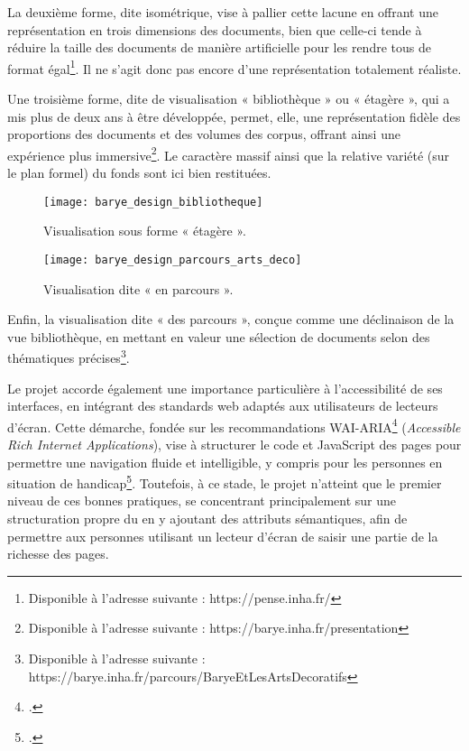 La deuxième forme, dite isométrique, vise à pallier cette lacune en offrant une représentation en trois dimensions des documents, bien que celle-ci tende à réduire la taille des documents de manière artificielle pour les rendre tous de format égal\footnote{Disponible à l’adresse suivante : https://pense.inha.fr/}. Il ne s’agit donc pas encore d’une représentation totalement réaliste.

Une troisième forme, dite de visualisation « bibliothèque » ou « étagère », qui a mis plus de deux ans à être développée, permet, elle, une représentation fidèle des proportions des documents et des volumes des corpus, offrant ainsi une expérience plus immersive\footnote{Disponible à l’adresse suivante : https://barye.inha.fr/presentation}. Le caractère massif ainsi que la relative variété (sur le plan formel) du fonds sont ici bien restituées.

\begin{figure}[h] 
        \centering 
        \texttt{[image: barye\_design\_bibliotheque]} 
        \caption{ Visualisation sous forme « étagère ».} 
        \label{fig:visualisation-biblio} 
\end{figure}

\begin{figure}[h] 
        \centering 
        \texttt{[image: barye\_design\_parcours\_arts\_deco]} 
        \caption{Visualisation dite « en parcours ».} 
        \label{fig:visualisation-parcours} 
    \end{figure}

Enfin, la visualisation dite « des parcours », conçue comme une déclinaison de la vue bibliothèque, en mettant en valeur une sélection de documents selon des thématiques précises\footnote{Disponible à l’adresse suivante : https://barye.inha.fr/parcours/BaryeEtLesArtsDecoratifs}.


Le projet \pense accorde également une importance particulière à l’accessibilité de ses interfaces, en intégrant des standards web adaptés aux utilisateurs de lecteurs d’écran. Cette démarche, fondée sur les recommandations WAI-ARIA\footcite{initiative_wai_wai-aria_nodate} (\textit{Accessible Rich Internet Applications}), vise à structurer le code \html et JavaScript des pages pour permettre une navigation fluide et intelligible, y compris pour les personnes en situation de handicap\footcite{faulkner_using_2018}. 
Toutefois, à ce stade, le projet n’atteint que le premier niveau de ces bonnes pratiques, se concentrant principalement sur une structuration propre du \html en y ajoutant des attributs sémantiques, afin de permettre aux personnes utilisant un lecteur d’écran de saisir une partie de la richesse des pages.

